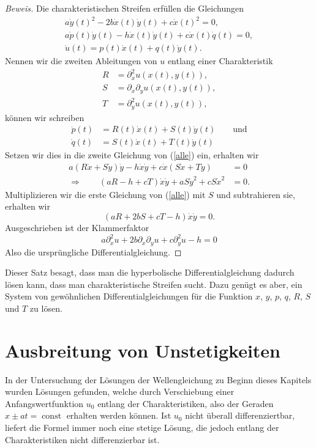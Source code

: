 \begin{proof}[Beweis]
Die charakteristischen Streifen erfüllen die Gleichungen
\begin{equation}
\begin{gathered}
a\dot y(t)^2-2b\dot x(t)\dot y(t)+c\dot x(t)^2=0,
\\
a\dot p(t)\dot y(t)-h\dot x(t)\dot y(t)+c\dot x(t)\dot q(t)=0,
\\
\dot u(t)=p(t)\dot x(t)+q(t)\dot y(t).
\end{gathered}
\label{alle}
\end{equation}
Nennen wir die zweiten Ableitungen von $u$ entlang einer Charakteristik
\begin{align*}
R&=\partial_x^2u(x(t),y(t)),
\\
S&=\partial_x\partial_yu(x(t),y(t)),
\\
T&=\partial_y^2u(x(t),y(t)),
\end{align*}
können wir schreiben
\begin{align*}
\dot p(t)&=R(t)\dot x(t)+S(t)\dot y(t)\qquad\text{und}\\
\dot q(t)&=S(t)\dot x(t)+T(t)\dot y(t)
\end{align*}
Setzen wir dies in die zweite Gleichung von (\ref{alle}) ein, erhalten wir
\begin{align*}
a(R\dot x+S\dot y)\dot y-h\dot x\dot y+c\dot x(S\dot x+T\dot y)&=0
\\
\Rightarrow \qquad(aR-h+cT)\dot x\dot y+aS\dot y^2 +cS \dot x^2&=0.
\end{align*}
Multiplizieren wir die erste Gleichung von (\ref{alle}) mit $S$ und subtrahieren
sie, erhalten wir
\[
(aR+2bS+cT-h)\dot x\dot y=0.
\]
Ausgeschrieben ist der Klammerfaktor
\[
a\partial_x^2u+2b\partial_x\partial_yu+c\partial_y^2u-h=0
\]
Also die ursprüngliche Differentialgleichung.
\end{proof}
Dieser Satz besagt, dass man die hyperbolische Differentialgleichung dadurch
lösen kann, dass man charakteristische Streifen sucht. Dazu genügt
es aber, ein System von gewöhnlichen Differentialgleichungen
für die Funktion $x$, $y$, $p$, $q$, $R$, $S$ und $T$
zu lösen.

\section{Ausbreitung von Unstetigkeiten}
In der Untersuchung der Lösungen der Wellengleichung zu Beginn
dieses Kapitels wurden Lösungen gefunden, welche durch Verschiebung
einer Anfangswertfunktion $u_0$ entlang der 
Charakteristiken, also der Geraden 
$x\pm at=\operatorname{const}$ erhalten werden können. Ist $u_0$
nicht überall differenziertbar, liefert die Formel immer noch eine
stetige Lösung, die jedoch entlang der Charakteristiken nicht
differenzierbar ist.

